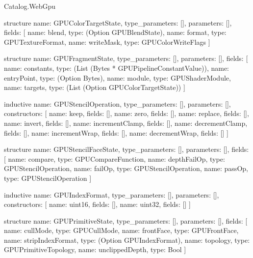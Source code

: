 \begin{lexlean}{Catalog.WebGpu}
\begin{semanticmodule}
structure{
  name: GPUColorTargetState,
  type_parameters: [],
  parameters: [],
  fields: [
    {name: blend, type: (Option GPUBlendState)},
    {name: format, type: GPUTextureFormat},
    {name: writeMask, type: GPUColorWriteFlags}
  ]
}

structure{
  name: GPUFragmentState,
  type_parameters: [],
  parameters: [],
  fields: [
    {name: constants, type: (List (Bytes * GPUPipelineConstantValue))},
    {name: entryPoint, type: (Option Bytes)},
    {name: module, type: GPUShaderModule},
    {name: targets, type: (List (Option GPUColorTargetState))}
  ]
}

inductive{
  name: GPUStencilOperation,
  type_parameters: [],
  parameters: [],
  constructors: [
    {name: keep, fields: []},
    {name: zero, fields: []},
    {name: replace, fields: []},
    {name: invert, fields: []},
    {name: incrementClamp, fields: []},
    {name: decrementClamp, fields: []},
    {name: incrementWrap, fields: []},
    {name: decrementWrap, fields: []}
  ]
}

structure{
  name: GPUStencilFaceState,
  type_parameters: [],
  parameters: [],
  fields: [
    {name: compare, type: GPUCompareFunction},
    {name: depthFailOp, type: GPUStencilOperation},
    {name: failOp, type: GPUStencilOperation},
    {name: passOp, type: GPUStencilOperation}
  ]
}

inductive{
  name: GPUIndexFormat,
  type_parameters: [],
  parameters: [],
  constructors: [
    {name: uint16, fields: []},
    {name: uint32, fields: []}
  ]
}

structure{
  name: GPUPrimitiveState,
  type_parameters: [],
  parameters: [],
  fields: [
    {name: cullMode, type: GPUCullMode},
    {name: frontFace, type: GPUFrontFace},
    {name: stripIndexFormat, type: (Option GPUIndexFormat)},
    {name: topology, type: GPUPrimitiveTopology},
    {name: unclippedDepth, type: Bool}
  ]
}


\end{semanticmodule}
\end{lexlean}
